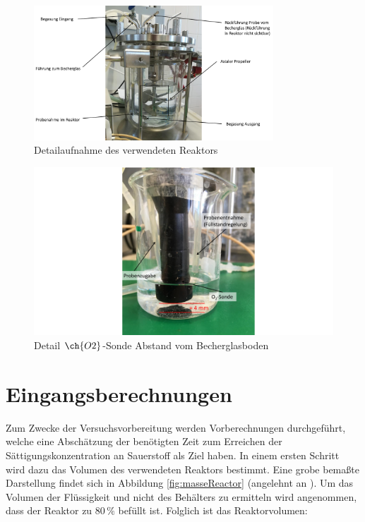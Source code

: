 \documentclass[12pt,liststotoc]{report}
\begin{document}
\begin{figure}[H]
\centering
\includegraphics[width=0.8\textwidth]{Graphics/Reaktor_detail.pdf} 
\caption{Detailaufnahme des verwendeten Reaktors}
\label{Reaktor_detail}
\end{figure}
\noindent

\begin{figure}[H]
\centering
\includegraphics[width=1\textwidth]{Graphics/Sonde_Detail_beschriftet.pdf} 
\caption{Detail $\ch{O2}$-Sonde Abstand vom Becherglasboden}
\label{Sonde_Detail}
\end{figure}
\noindent


\chapter{Eingangsberechnungen}

Zum Zwecke der Versuchsvorbereitung werden Vorberechnungen durchgeführt, welche eine Abschätzung der benötigten Zeit zum Erreichen der Sättigungskonzentration an Sauerstoff als Ziel haben. In einem ersten Schritt wird dazu das Volumen des verwendeten Reaktors bestimmt. Eine grobe bemaßte Darstellung findet sich in Abbildung \ref{fig:masseReactor} (angelehnt an \cite{Labor_Skript}). Um das Volumen der Flüssigkeit und nicht des Behälters zu ermitteln wird angenommen, dass der Reaktor zu 80\,$\%$ befüllt ist. Folglich ist das Reaktorvolumen:
\end{document}
